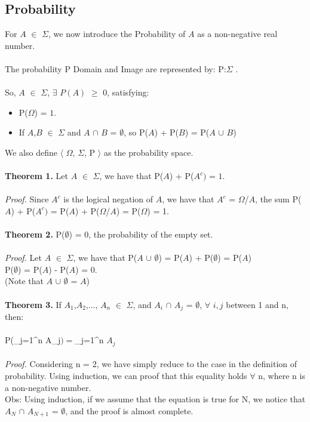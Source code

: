 \documentclass{book}
\begin{document}
\subsection{Probability}

For $A$ $\in$ $\Sigma$, we now introduce the Probability of $A$ as a non-negative real number.\\ 
\\ 
The probability P Domain and Image are represented by: P:$\Sigma$ \mapsto [0,1].\\ 
\\ 
So, \forall$A$ $\in$ $\Sigma$, $\exists$ $P(A)$ $\geq$ $0$, satisfying:
\begin{itemize}
    \item P($\Omega$) = $1$.
    \item If $A$,$B$ $\in$ $\Sigma$ and $A$ $\cap$ $B$ =  $\emptyset$, so P($A$) + P($B$) = P($A$ $\cup$ $B$)
\end{itemize}
We also define $\langle$ $\Omega$, $\Sigma$, P $\rangle$ as the probability space.
\\ \\ 
 \textbf{Theorem 1.}
 Let $A$ $\in$ $\Sigma$, we have that P($A$) + P($A^c)$ = $1$.
  \\ 
   \\ 
  \textit{Proof.} Since $A^c$ is the logical negation of $A$, we have that $A^c$ =  $\Omega$/$A$, the sum P($A$) + P($A^c)$ = P($A$) + P($\Omega$/$A$) = P($\Omega$) = 1.
   \\ \\ 
  \textbf{Theorem 2.} P($\emptyset$) = 0, the probability of the empty set.
     \\ \\ 
   \textit{Proof.} Let $A$ $\in$ $\Sigma$, we have that P($A$ $\cup$ $\emptyset$) = P($A$) + P($\emptyset$) = P($A$)\\
     \hspace*{6.2cm}\Rightarrow P($\emptyset$) = P($A$) - P($A$) = 0. \\
  \hspace*{7cm}(Note that $A$ $\cup$ $\emptyset$ = $A$)
       \\ \\ 
  \textbf{Theorem 3.} If $A_1$,$A_2$,..., $A_n$ $\in$ $\Sigma$, and $A_i$ $\cap$ $A_j$ = $\emptyset$, $\forall$ $i,j$ between 1 and n, then:\\  \\   \hspace*{6.2cm}P(\bigcup\limits_{j=1}^{n} A_j$) = $\sum_{j=1}^{n} $A_j$ 
 \\ \\ 
\textit{Proof.} Considering n = 2, we have simply reduce to the case in the definition of probability. Using induction, we can proof that this equality holds $\forall$ n, where n is a  non-negative number.  \\ 
Obs: Using induction, if we assume that the equation is true for N, we notice that $A_N$  $\cap$ $A_{N+1}$ = $\emptyset$, and the proof is almost complete.
\end{document}

